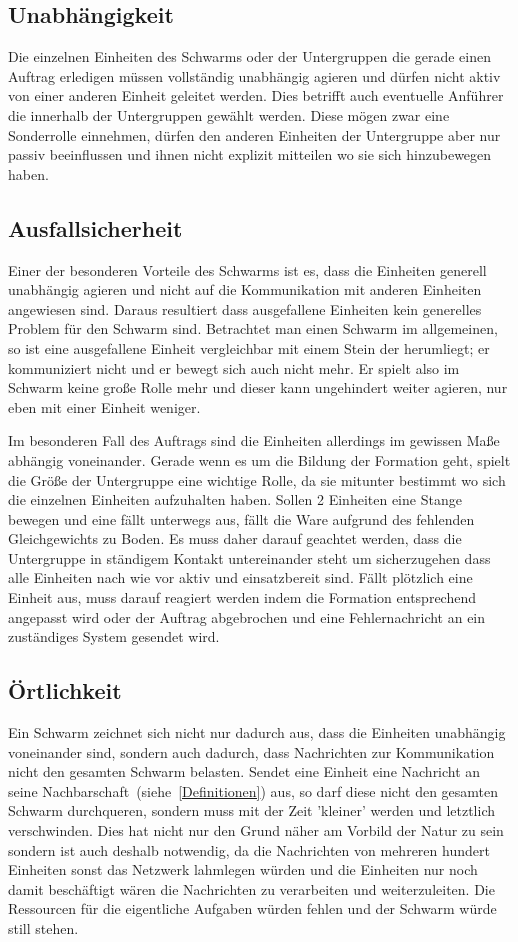 \subsection*{Unabhängigkeit}
Die einzelnen Einheiten des Schwarms oder der Untergruppen die gerade einen Auftrag erledigen müssen vollständig unabhängig agieren und dürfen nicht aktiv von einer anderen Einheit geleitet werden.
Dies betrifft auch eventuelle Anführer die innerhalb der Untergruppen gewählt werden.
Diese mögen zwar eine Sonderrolle einnehmen, dürfen den anderen Einheiten der Untergruppe aber nur passiv beeinflussen und ihnen nicht explizit mitteilen wo sie sich hinzubewegen haben.

\subsection*{Ausfallsicherheit}
Einer der besonderen Vorteile des Schwarms ist es, dass die Einheiten generell unabhängig agieren und nicht auf die Kommunikation mit anderen Einheiten angewiesen sind.
Daraus resultiert dass ausgefallene Einheiten kein generelles Problem für den Schwarm sind.
Betrachtet man einen Schwarm im allgemeinen, so ist eine ausgefallene Einheit vergleichbar mit einem Stein der herumliegt; er kommuniziert nicht und er bewegt sich auch nicht mehr.
Er spielt also im Schwarm keine große Rolle mehr und dieser kann ungehindert weiter agieren, nur eben mit einer Einheit weniger.

Im besonderen Fall des Auftrags sind die Einheiten allerdings im gewissen Maße abhängig voneinander.
Gerade wenn es um die Bildung der Formation geht, spielt die Größe der Untergruppe eine wichtige Rolle, da sie mitunter bestimmt wo sich die einzelnen Einheiten aufzuhalten haben.
Sollen 2 Einheiten eine Stange bewegen und eine fällt unterwegs aus, fällt die Ware aufgrund des fehlenden Gleichgewichts zu Boden.
Es muss daher darauf geachtet werden, dass die Untergruppe in ständigem Kontakt untereinander steht um sicherzugehen dass alle Einheiten nach wie vor aktiv und einsatzbereit sind.
Fällt plötzlich eine Einheit aus, muss darauf reagiert werden indem die Formation entsprechend angepasst wird oder der Auftrag abgebrochen und eine Fehlernachricht an ein zuständiges System gesendet wird.

\subsection*{Örtlichkeit}
Ein Schwarm zeichnet sich nicht nur dadurch aus, dass die Einheiten unabhängig voneinander sind, sondern auch dadurch, dass Nachrichten zur Kommunikation nicht den gesamten Schwarm belasten.
Sendet eine Einheit eine Nachricht an seine Nachbarschaft~(siehe~\autoref{Definitionen}) aus, so darf diese nicht den gesamten Schwarm durchqueren, sondern muss mit der Zeit 'kleiner' werden und letztlich verschwinden.
Dies hat nicht nur den Grund näher am Vorbild der Natur zu sein
sondern ist auch deshalb notwendig, da die Nachrichten von mehreren hundert Einheiten sonst das Netzwerk lahmlegen würden und die Einheiten nur noch damit beschäftigt wären die Nachrichten zu verarbeiten und weiterzuleiten.
Die Ressourcen für die eigentliche Aufgaben würden fehlen und der Schwarm würde still stehen.